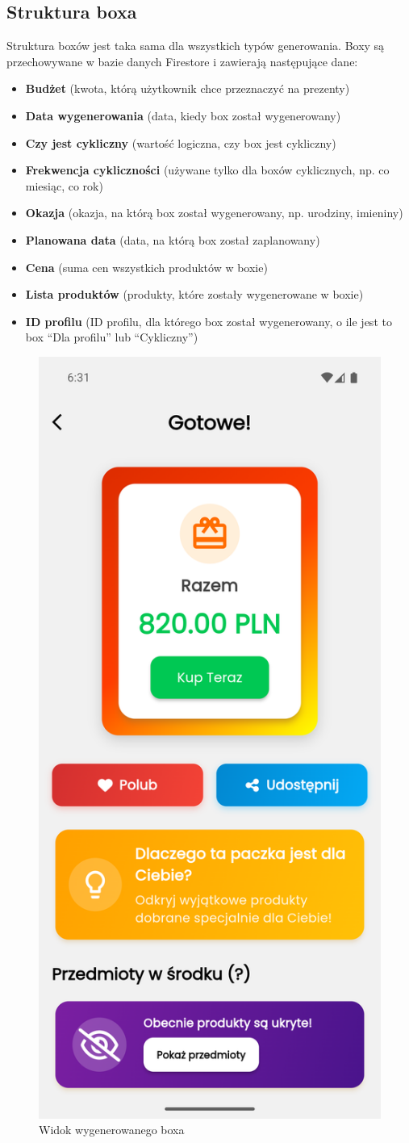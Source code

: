 \documentclass[a4paper, 12pt]{article}
\begin{document}
\subsection{Struktura boxa}
Struktura boxów jest taka sama dla wszystkich typów generowania. Boxy są przechowywane w bazie danych Firestore i zawierają następujące dane:
\begin{itemize}
    \item \textbf{Budżet} (kwota, którą użytkownik chce przeznaczyć na prezenty)
    \item \textbf{Data wygenerowania} (data, kiedy box został wygenerowany)
    \item \textbf{Czy jest cykliczny} (wartość logiczna, czy box jest cykliczny)
    \item \textbf{Frekwencja cykliczności} (używane tylko dla boxów cyklicznych, np. co miesiąc, co rok)
    \item \textbf{Okazja} (okazja, na którą box został wygenerowany, np. urodziny, imieniny)
    \item \textbf{Planowana data} (data, na którą box został zaplanowany)
    \item \textbf{Cena} (suma cen wszystkich produktów w boxie)
    \item \textbf{Lista produktów} (produkty, które zostały wygenerowane w boxie)
    \item \textbf{ID profilu} (ID profilu, dla którego box został wygenerowany, o ile jest to box ``Dla profilu'' lub ``Cykliczny'')
\end{itemize}
\begin{figure}[H]
    \centering
    \includegraphics[width=0.3\linewidth,keepaspectratio]{images/box_summary.png}
    \caption{Widok wygenerowanego boxa}
    \label{fig:box-summary}
\end{figure}
\newpage
\end{document}
